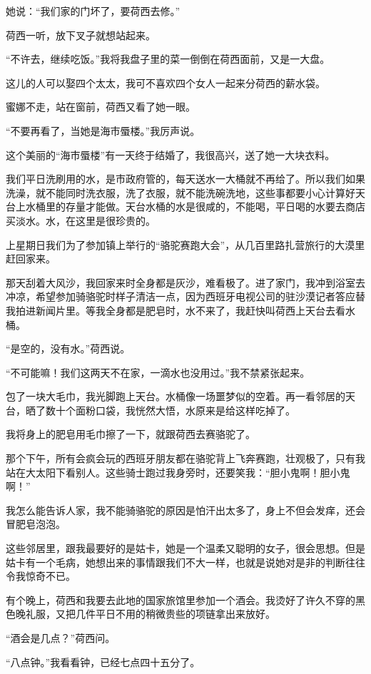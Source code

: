 \par 她说：“我们家的门坏了，要荷西去修。”
\par 荷西一听，放下叉子就想站起来。
\par “不许去，继续吃饭。”我将我盘子里的菜一倒倒在荷西面前，又是一大盘。
\par 这儿的人可以娶四个太太，我可不喜欢四个女人一起来分荷西的薪水袋。
\par 蜜娜不走，站在窗前，荷西又看了她一眼。
\par “不要再看了，当她是海市蜃楼。”我厉声说。
\par 这个美丽的“海市蜃楼”有一天终于结婚了，我很高兴，送了她一大块衣料。
\par 我们平日洗刷用的水，是市政府管的，每天送水一大桶就不再给了。所以我们如果洗澡，就不能同时洗衣服，洗了衣服，就不能洗碗洗地，这些事都要小心计算好天台上水桶里的存量才能做。天台水桶的水是很咸的，不能喝，平日喝的水要去商店买淡水。水，在这里是很珍贵的。
\par 上星期日我们为了参加镇上举行的“骆驼赛跑大会”，从几百里路扎营旅行的大漠里赶回家来。
\par 那天刮着大风沙，我回家来时全身都是灰沙，难看极了。进了家门，我冲到浴室去冲凉，希望参加骑骆驼时样子清洁一点，因为西班牙电视公司的驻沙漠记者答应替我拍进新闻片里。等我全身都是肥皂时，水不来了，我赶快叫荷西上天台去看水桶。
\par “是空的，没有水。”荷西说。
\par “不可能嘛！我们这两天不在家，一滴水也没用过。”我不禁紧张起来。
\par 包了一块大毛巾，我光脚跑上天台。水桶像一场噩梦似的空着。再一看邻居的天台，晒了数十个面粉口袋，我恍然大悟，水原来是给这样吃掉了。
\par 我将身上的肥皂用毛巾擦了一下，就跟荷西去赛骆驼了。
\par 那个下午，所有会疯会玩的西班牙朋友都在骆驼背上飞奔赛跑，壮观极了，只有我站在大太阳下看别人。这些骑士跑过我身旁时，还要笑我：“胆小鬼啊！胆小鬼啊！”
\par 我怎么能告诉人家，我不能骑骆驼的原因是怕汗出太多了，身上不但会发痒，还会冒肥皂泡泡。
\par 这些邻居里，跟我最要好的是姑卡，她是一个温柔又聪明的女子，很会思想。但是姑卡有一个毛病，她想出来的事情跟我们不大一样，也就是说她对是非的判断往往令我惊奇不已。
\par 有个晚上，荷西和我要去此地的国家旅馆里参加一个酒会。我烫好了许久不穿的黑色晚礼服，又把几件平日不用的稍微贵些的项链拿出来放好。
\par “酒会是几点？”荷西问。
\par “八点钟。”我看看钟，已经七点四十五分了。
